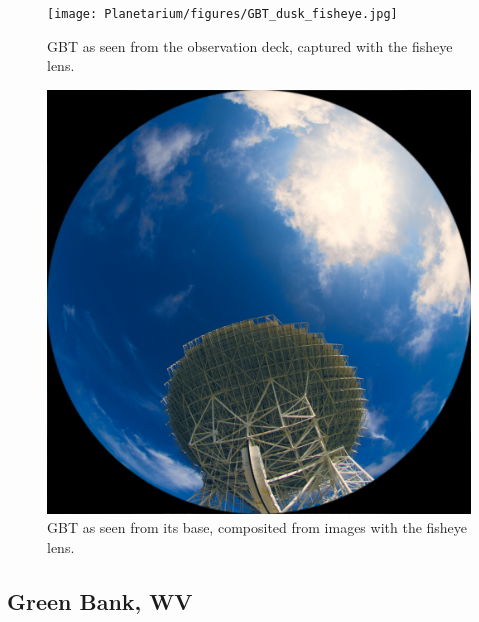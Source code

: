 \begin{figure}[htb]
\centering
\begin{minipage}[b]{0.54\textwidth}
\centering
\texttt{[image: Planetarium/figures/GBT\_dusk\_fisheye.jpg]}
\caption{GBT as seen from the observation deck, captured with the fisheye lens.}
\label{Fig:GBT_dusk_fisheye}
\end{minipage}%
\begin{minipage}[b]{0.02\textwidth}
\hspace{1cm}
\end{minipage}%
\begin{minipage}[b]{0.42\textwidth}
\centering
\includegraphics[width=0.95\linewidth]{Planetarium/figures/GBT_base_render.jpg}
\caption{GBT as seen from its base, composited from images with the fisheye lens.}
\label{Fig:GBT_base_fisheye}
\end{minipage}
\end{figure}


\subsection{Green Bank, WV}

